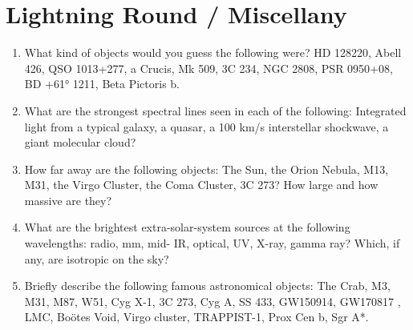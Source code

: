 \documentclass[11pt, oneside]{book}
\begin{document}
\section{Lightning Round / Miscellany}

\begin{enumerate}[start=164, itemsep=0.4cm]
    \item What kind of objects would you guess the following were? HD 128220, Abell 426, QSO 1013+277, a Crucis, Mk 509, 3C 234, NGC 2808, PSR 0950+08, BD +61° 1211, Beta Pictoris b.
    \item What are the strongest spectral lines seen in each of the following: Integrated light from a typical galaxy, a quasar, a 100 km/s interstellar shockwave, a giant molecular cloud?
    \item How far away are the following objects: The Sun, the Orion Nebula, M13, M31, the Virgo Cluster, the Coma Cluster, 3C 273? How large and how massive are they?
    \item What are the brightest extra-solar-system sources at the following wavelengths: radio, mm, mid- IR, optical, UV, X-ray, gamma ray? Which, if any, are isotropic on the sky?
    \item Briefly describe the following famous astronomical objects: The Crab, M3, M31, M87, W51, Cyg X-1, 3C 273, Cyg A, SS 433, GW150914, GW170817 , LMC, Boötes Void, Virgo cluster, TRAPPIST-1, Prox Cen b, Sgr A*.
\end{enumerate}

\end{document}
